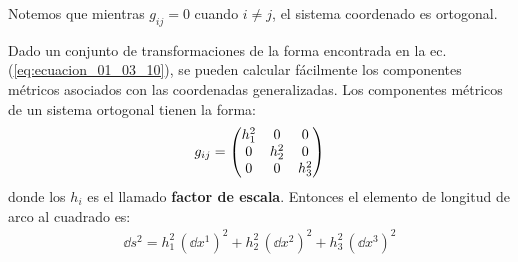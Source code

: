 \documentclass[hidelinks,12pt]{article}
\begin{document}
Notemos que mientras $g_{ij} = 0$ cuando $i \neq j$, el sistema coordenado es ortogonal.

\par
Dado un conjunto de transformaciones de la forma encontrada en la ec. (\ref{eq:ecuacion_01_03_10}), se pueden calcular fácilmente los componentes métricos asociados con las coordenadas generalizadas. Los componentes métricos de un sistema ortogonal tienen la forma:
\begin{align*}
g_{ij} = \mqty(
h_{1}^{2} & 0 & 0 \\
0 & h_{2}^{2} & 0 \\
0 & 0 & h_{3}^{2})
\end{align*}
donde los $h_{i}$ es el llamado \textbf{factor de escala}. Entonces el elemento de longitud de arco al cuadrado es:
\begin{align*}
\dd{s}^{2} = h_{1}^{2} \, (\dd{x}^{1})^{2} + h_{2}^{2} \, (\dd{x}^{2})^{2} + h_{3}^{2} \, (\dd{x}^{3})^{2}
\end{align*}
\end{document}
